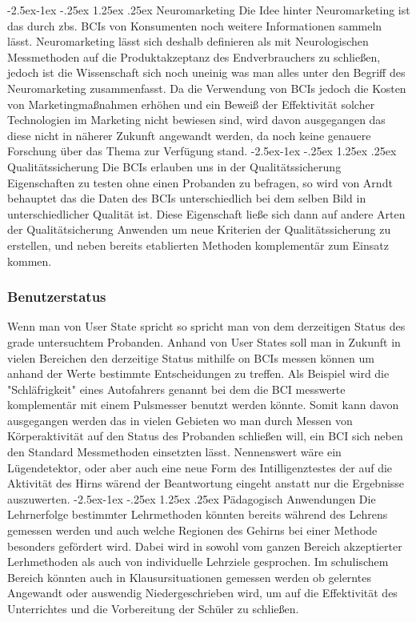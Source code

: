 \documentclass[11pt,ngerman,parskip=half]{scrartcl}
\makeatletter
\renewcommand\paragraph{\@startsection{paragraph}{4}{\z@}%
            {-2.5ex\@plus -1ex \@minus -.25ex}%
            {1.25ex \@plus .25ex}%
            {\normalfont\normalsize\bfseries}}
\makeatother
\begin{document}
\paragraph{Neuromarketing}
Die Idee hinter Neuromarketing ist das durch zbs. BCIs von Konsumenten noch weitere Informationen 
sammeln lässt. Neuromarketing lässt sich deshalb definieren als mit Neurologischen Messmethoden auf 
die Produktakzeptanz des Endverbrauchers zu schließen, jedoch ist die Wissenschaft sich noch uneinig was 
man alles unter den Begriff des Neuromarketing zusammenfasst\parencite{marketing,beyond}. Da die Verwendung 
von BCIs jedoch die Kosten von Marketingmaßnahmen erhöhen und ein Beweiß der Effektivität solcher 
Technologien im Marketing nicht bewiesen sind, wird davon ausgegangen das diese nicht in näherer Zukunft 
angewandt werden, da noch keine genauere Forschung über das Thema zur Verfügung stand.
\paragraph{Qualitätssicherung}
Die BCIs erlauben uns in der Qualitätssicherung Eigenschaften zu testen ohne einen Probanden zu befragen,
 so wird von Arndt behauptet das die Daten des BCIs unterschiedlich bei dem selben Bild in unterschiedlicher Qualität ist\parencite{video}. 
 Diese Eigenschaft ließe sich dann auf andere Arten der Qualitätsicherung Anwenden um neue Kriterien der Qualitätssicherung zu erstellen, 
 und neben bereits etablierten Methoden komplementär zum Einsatz kommen.
\subsubsection{Benutzerstatus}
Wenn man von User State spricht so spricht man von dem derzeitigen Status des grade untersuchtem Probanden. Anhand
von User States soll man in Zukunft in vielen Bereichen den derzeitige Status mithilfe on BCIs messen können um anhand der 
Werte bestimmte Entscheidungen zu treffen. Als Beispiel wird die "Schläfrigkeit" eines Autofahrers genannt bei dem die BCI messwerte 
komplementär mit einem Pulsmesser benutzt werden könnte. Somit kann davon ausgegangen werden das in vielen Gebieten wo man durch Messen 
von Körperaktivität auf den Status des Probanden schließen will, ein BCI sich neben den Standard Messmethoden einsetzten lässt. Nennenswert wäre ein 
Lügendetektor, oder aber auch eine neue Form des Intilligenztestes der auf die Aktivität des Hirns wärend der Beantwortung eingeht anstatt nur die 
Ergebnisse auszuwerten.\parencite[vgl 3.2]{beyond}
\paragraph{Pädagogisch Anwendungen}
Die Lehrnerfolge bestimmter Lehrmethoden könnten bereits während des Lehrens gemessen werden und auch welche 
Regionen des Gehirns bei einer Methode besonders gefördert wird. Dabei wird in \parencite{beyond} 
sowohl vom ganzen Bereich akzeptierter Lerhmethoden als auch von individuelle Lehrziele gesprochen.
Im schulischem Bereich könnten auch in Klausursituationen gemessen werden ob gelerntes Angewandt oder 
auswendig Niedergeschrieben wird, um auf die Effektivität des Unterrichtes und die Vorbereitung der Schüler zu schließen.
\end{document}
